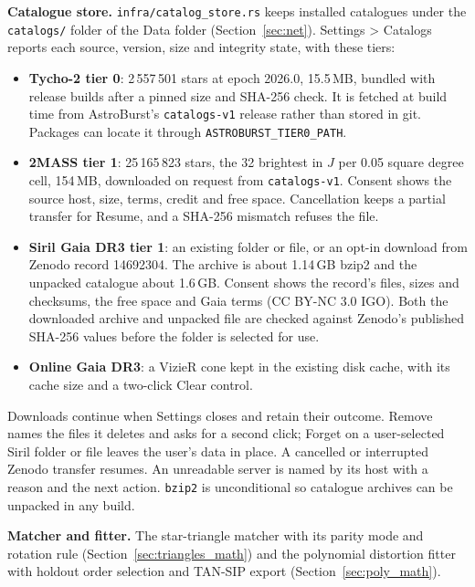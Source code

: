 \documentclass[11pt,a4paper]{article}
\newcommand{\code}[1]{\texttt{\small #1}}
\newcommand{\crate}[1]{\texttt{#1}}
\begin{document}
    \textbf{Catalogue store.} \code{infra/catalog\_store.rs} keeps installed catalogues under the \code{catalogs/} folder of the Data folder (Section~\ref{sec:net}). Settings > Catalogs reports each source, version, size and integrity state, with these tiers:
    \begin{itemize}[nosep]
    \item \textbf{Tycho-2 tier 0}: 2\,557\,501 stars at epoch 2026.0, 15.5\,MB, bundled with release builds after a pinned size and SHA-256 check. It is fetched at build time from AstroBurst's \code{catalogs-v1} release rather than stored in git. Packages can locate it through \code{ASTROBURST\_TIER0\_PATH}.
    \item \textbf{2MASS tier 1}: 25\,165\,823 stars, the 32 brightest in $J$ per 0.05 square degree cell, 154\,MB, downloaded on request from \code{catalogs-v1}. Consent shows the source host, size, terms, credit and free space. Cancellation keeps a partial transfer for Resume, and a SHA-256 mismatch refuses the file.
    \item \textbf{Siril Gaia DR3 tier 1}: an existing folder or file, or an opt-in download from Zenodo record 14692304. The archive is about 1.14\,GB bzip2 and the unpacked catalogue about 1.6\,GB. Consent shows the record's files, sizes and checksums, the free space and Gaia terms (CC BY-NC 3.0 IGO). Both the downloaded archive and unpacked file are checked against Zenodo's published SHA-256 values before the folder is selected for use.
    \item \textbf{Online Gaia DR3}: a VizieR cone kept in the existing disk cache, with its cache size and a two-click Clear control.
    \end{itemize}
    Downloads continue when Settings closes and retain their outcome. Remove names the files it deletes and asks for a second click; Forget on a user-selected Siril folder or file leaves the user's data in place. A cancelled or interrupted Zenodo transfer resumes. An unreadable server is named by its host with a reason and the next action. \crate{bzip2} is unconditional so catalogue archives can be unpacked in any build.

    \textbf{Matcher and fitter.} The star-triangle matcher with its parity mode and rotation rule (Section~\ref{sec:triangles_math}) and the polynomial distortion fitter with holdout order selection and TAN-SIP export (Section~\ref{sec:poly_math}).
\end{document}
